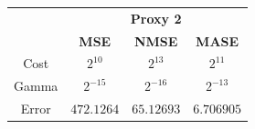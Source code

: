 \begin{center}
\begin{tabular}{|c|c|c|c|}
\hline
& \multicolumn{3}{|c|}{\textbf{Proxy 2}} \\ \cline{2-4}
& \textbf{MSE} & \textbf{NMSE} & \textbf{MASE}          \\ \hline
Cost  & $2^{10}$    &$2^{13}$ & $2^{11}$     \\ 
Gamma & $2^{-15}$   &$2^{-16}$& $2^{-13}$     \\ 
Error & $472.1264$ &$65.12693$& $6.706905$     \\ 
\hline
\end{tabular}
 \begin{figure}[!h]
\centering
{}
\end{figure}
\end{center}

